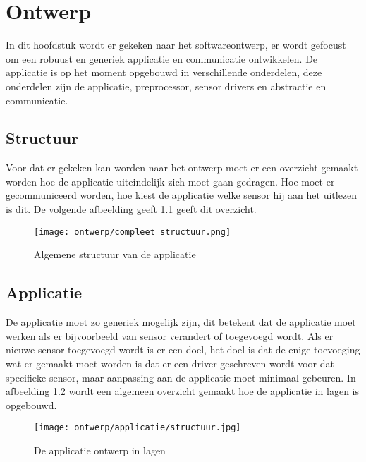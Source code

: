 \chapter{Ontwerp}
In dit hoofdstuk wordt er gekeken naar het softwareontwerp, er wordt gefocust om een robuust en generiek applicatie en communicatie ontwikkelen. De applicatie is op het moment opgebouwd in verschillende onderdelen, deze onderdelen zijn de applicatie, preprocessor, sensor drivers en abstractie en communicatie.

\section{Structuur}
Voor dat er gekeken kan worden naar het ontwerp moet er een overzicht gemaakt worden hoe de applicatie uiteindelijk zich moet gaan gedragen. Hoe moet er gecommuniceerd worden, hoe kiest de applicatie welke sensor hij aan het uitlezen is dit. De volgende afbeelding geeft \ref{fig:appstructuur} geeft dit overzicht. 
\begin{figure}[h!]
	\centering
	\label{fig:appstructuur}

	\texttt{[image: ontwerp/compleet structuur.png]}
	\caption{Algemene structuur van de applicatie}
\end{figure}

\newpage
\section{Applicatie}
De applicatie moet zo generiek mogelijk zijn, dit betekent dat de applicatie moet werken als er bijvoorbeeld van sensor verandert of toegevoegd wordt. Als er nieuwe sensor toegevoegd wordt is er een doel, het doel is dat de enige toevoeging wat er gemaakt moet worden is dat er een driver geschreven wordt voor dat specifieke sensor, maar aanpassing aan de applicatie moet minimaal gebeuren. In afbeelding \ref{fig:appontwerp} wordt een algemeen overzicht gemaakt hoe de applicatie in lagen is opgebouwd. 
\begin{figure}[h!]
	\centering
	\label{fig:appontwerp}

	\texttt{[image: ontwerp/applicatie/structuur.jpg]}
	\caption{De applicatie ontwerp in lagen}
\end{figure}



